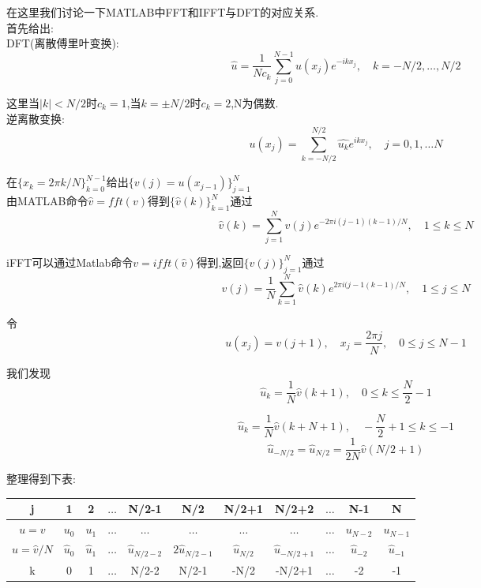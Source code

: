 \documentclass[12pt]{article}
\begin{document}
\begin{CJK}{UTF8}{gkai}
    在这里我们讨论一下MATLAB中FFT和IFFT与DFT的对应关系.\\
    
    首先给出:\\
    
    DFT(离散傅里叶变换):\\
    
   $$ \hat{u}=\dfrac{1}{Nc_{k}}\sum_{j=0}^{N-1}u(x_j)e^{-  ikx_j},\quad k=-N/2,\dots,N/2$$
   
   这里当$|k|< N/2$时$c_k=1$,当$k=\pm N/2$时$c_k=2$,N为偶数.\\
   
    逆离散变换:\\
  
  $$u(x_j)=\sum_{k=-N/2}^{N/2} \hat{u_k}e^{ikx_j},\quad j=0,1,\dots N$$
  
  在$\{x_k=2\pi k /N\}_{k=0}^{N-1}$给出$\{v(j)=u(x_{j-1})\}_{j=1}^{N}$\\
  
 由MATLAB命令$ \hat{v}=fft(v)$得到$\{\hat{v}(k)\}_{k=1}^N$通过\\
 
 $$\hat{v}(k)=\sum_{j=1}^{N}v(j)e^{-2\pi i(j-1)(k-1)/N},\quad 1\leq k \leq N$$
 
 iFFT可以通过Matlab命令$v=ifft(\hat  {v})$得到,返回$\{v(j)\}_{j=1}^N$通过\\
 
 $$v(j)=\dfrac{1}{N}\sum_{k=1}^{N}\hat{v}(k)e^{2\pi i(j-1(k-1)/N}, \quad 1\leq j\leq N$$
 
 令\\
 
 $$u(x_j)=v(j+1),\quad x_j=\dfrac{2\pi j}{N},\quad 0\leq j \leq N-1$$
 
 我们发现\\
 
 $$ \hat{u}_k=\dfrac{1}{N}\hat{v}(k+1), \quad 0\leq k \leq \dfrac{N}{2}-1$$
 
 $$ \hat{u}_k=\dfrac{1}{N}\hat{v}(k+N+1), \quad -\dfrac{N}{2}+1\leq k \leq-1$$
 $$ \hat{u}_{-N/2}=\hat{u}_{N/2} = \dfrac{1}{2N}\hat{v}(N/2+1)$$
 
 整理得到下表:\\
 
\begin{table}[H]
	\centering
	\begin{tabular}{ccccccccccc}
		
		\toprule
		j&1& 2  &$\dots$&N/2-1&N/2&N/2+1&N/2+2&$\dots$&N-1&N\\
		\midrule    
       $u=v$&$u_0$&$u_1$&$\dots$&$\dots$&$\dots$&$\dots$&$\dots$&$\dots$&$u_{N-2}$&$u_{N-1}$\\
       $\hat{u}=\hat{v}/N$&$\hat{u}_0$&$\hat{u}_1$&$\dots$&$\hat{u}_{N/2-2}$&$2\hat{u}_{N/2-1}$&$\hat{u}_{N/2}$&$\hat{u}_{-N/2+1}$&$\dots$&$\hat{u}_{-2}$&$\hat{u}_{-1}$\\
       k&0&1&$\dots$&N/2-2&N/2-1&-N/2&-N/2+1&$\dots$&-2&-1\\
		\bottomrule
	\end{tabular}
\end{table} 


\end{CJK}
\end{document}
